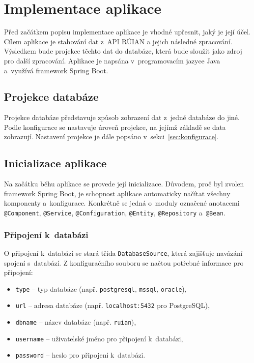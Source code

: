 \chapter{Implementace aplikace}
Před začátkem popisu implementace aplikace je vhodné upřesnit, jaký je její účel.  
Cílem aplikace je stahování dat z~API RÚIAN a jejich následné zpracování.  
Výsledkem bude projekce těchto dat do databáze, která bude sloužit jako zdroj pro další zpracování.  
Aplikace je napsána v~programovacím jazyce Java a~využívá framework Spring Boot.

\section{Projekce databáze}
Projekce databáze představuje způsob zobrazení dat z~jedné databáze do jiné.  
Podle konfigurace se nastavuje úroveň projekce, na jejímž základě se data zobrazují.  
Nastavení projekce je dále popsáno v~sekci~\ref{sec:konfigurace}.

\section{Inicializace aplikace}
Na začátku běhu aplikace se provede její inicializace.  
Důvodem, proč byl zvolen framework Spring Boot, je schopnost aplikace automaticky načítat všechny komponenty a~konfigurace.  
Konkrétně se jedná o~moduly označené anotacemi \texttt{@Component}, \texttt{@Service}, \texttt{@Configuration}, \texttt{@Entity}, \texttt{@Repository} a~\texttt{@Bean}.

\subsection{Připojení k~databázi}
O připojení k~databázi se stará třída \texttt{DatabaseSource}, která zajišťuje navázání spojení s~databází.  
Z konfiguračního souboru se načtou potřebné informace pro připojení:
\begin{itemize}
    \item \texttt{type} -- typ databáze (např. \texttt{postgresql}, \texttt{mssql}, \texttt{oracle}),
    \item \texttt{url} -- adresa databáze (např. \texttt{localhost:5432} pro PostgreSQL),
    \item \texttt{dbname} -- název databáze (např. \texttt{ruian}),
    \item \texttt{username} -- uživatelské jméno pro připojení k~databázi,
    \item \texttt{password} -- heslo pro připojení k~databázi.
\end{itemize}

